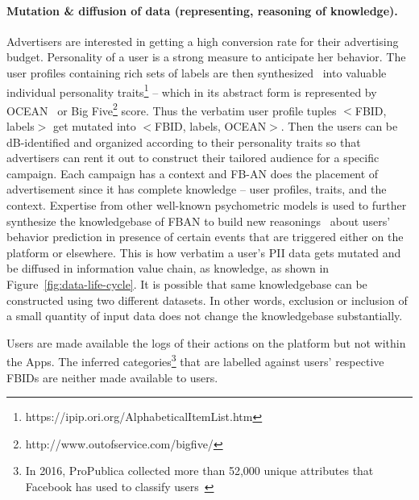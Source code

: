 \documentclass[runningheads]{llncs}
\begin{document}
\paragraph{Mutation \& diffusion of data (representing, reasoning of
  knowledge).} Advertisers are interested in getting a high conversion
rate for their advertising budget. Personality of a user is a strong
measure to anticipate her behavior. The user profiles containing rich
sets of labels are then
synthesized~\cite{kosinski-youyou,kosinski-likes} into valuable
individual personality
traits\footnote{https://ipip.ori.org/AlphabeticalItemList.htm} --
which in its abstract form is represented by OCEAN~\cite{ocean-costa}
or Big Five\footnote{http://www.outofservice.com/bigfive/} score. Thus
the verbatim user profile tuples $<$FBID, labels$>$ get mutated into
$<$FBID, labels, OCEAN$>$. Then the users can be dB-identified and
organized according to their personality traits so that advertisers
can rent it out to construct their tailored audience for a specific
campaign. Each campaign has a context and FB-AN does the placement of
advertisement since it has complete knowledge -- user profiles,
traits, and the context. Expertise from other well-known psychometric
models is used to further synthesize the knowledgebase of FBAN to build
new reasonings~\cite{parsinomious} about users' behavior prediction in
presence of certain events that are triggered either on the platform
or elsewhere.  This is how verbatim a user's PII data gets mutated and
be diffused in information value chain, as knowledge, as shown in
Figure~\ref{fig:data-life-cycle}. It is possible that same
knowledgebase can be constructed using two different datasets. In
other words, exclusion or inclusion of a small quantity of input data
does not change the knowledgebase substantially.

Users are made available the logs of their actions on the platform but
not within the Apps. The inferred categories\footnote{In 2016,
  ProPublica collected more than 52,000 unique attributes that
  Facebook has used to classify users~\cite{fb-ad-categories}} that
are labelled against users' respective FBIDs are neither made
available to users.
\end{document}

